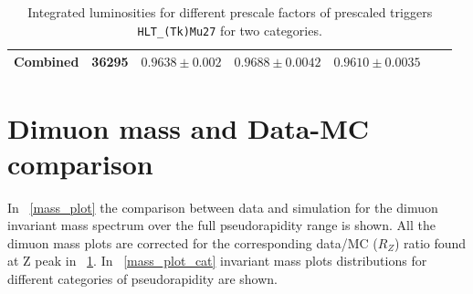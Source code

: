 \begin{table}[htb!]
\begin{center}
{\begin{tabular}{|r|r|l|l|l|l|l|}
\hline
Combined                 & 36295\hspace*{1.0em} & $0.9638 \pm 0.002$ &  $0.9688 \pm 0.0042$ & $0.9610 \pm 0.0035$  \\ \hline
\end{tabular}}
\caption{\label{tab:prescale_lumi}
Integrated luminosities for different prescale factors of prescaled triggers \texttt{HLT\_(Tk)Mu27} for two categories.
}
\end{center}
\end{table}

\begin{table}[htb!]
\caption{\label{tab:periods}
Used run periods.
}
\end{table}

\section{Dimuon mass and Data-MC comparison}
In \figurename~\ref{mass_plot} the comparison between data and simulation for the dimuon invariant mass spectrum over the full pseudorapidity range is shown. All the dimuon mass plots are corrected for the corresponding data/MC ($R_Z$) ratio found at Z peak in \tablename~\ref{tab:prescale_lumi}. In \figurename~\ref{mass_plot_cat} invariant mass plots distributions for different categories of pseudorapidity are shown.

